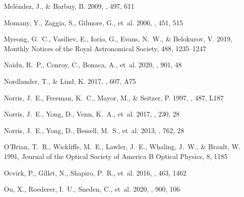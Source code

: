 \documentclass[twocolumn]{aastex63}
\begin{document}
\begin{thebibliography}{}
{Mel{\'e}ndez}, J., \& {Barbuy}, B. 2009, \aap, 497, 611

{Momany}, Y., {Zaggia}, S., {Gilmore}, G., {et~al.} 2006, \aap, 451, 515

Myeong, G.~C., Vasiliev, E., Iorio, G., Evans, N.~W., \& Belokurov, V. 2019,
  Monthly Notices of the Royal Astronomical Society, 488, 1235–1247

{Naidu}, R.~P., {Conroy}, C., {Bonaca}, A., {et~al.} 2020, \apj, 901, 48

{Nordlander}, T., \& {Lind}, K. 2017, \aap, 607, A75

{Norris}, J.~E., {Freeman}, K.~C., {Mayor}, M., \& {Seitzer}, P. 1997, \apjl,
  487, L187

{Norris}, J.~E., {Yong}, D., {Venn}, K.~A., {et~al.} 2017, \apjs, 230, 28

{Norris}, J.~E., {Yong}, D., {Bessell}, M.~S., {et~al.} 2013, \apj, 762, 28

{O'Brian}, T.~R., {Wickliffe}, M.~E., {Lawler}, J.~E., {Whaling}, J.~W., \&
  {Brault}, W. 1991, Journal of the Optical Society of America B Optical
  Physics, 8, 1185

{Ocvirk}, P., {Gillet}, N., {Shapiro}, P.~R., {et~al.} 2016, \mnras, 463, 1462

{Ou}, X., {Roederer}, I.~U., {Sneden}, C., {et~al.} 2020, \apj, 900, 106


\end{thebibliography}
\end{document}
